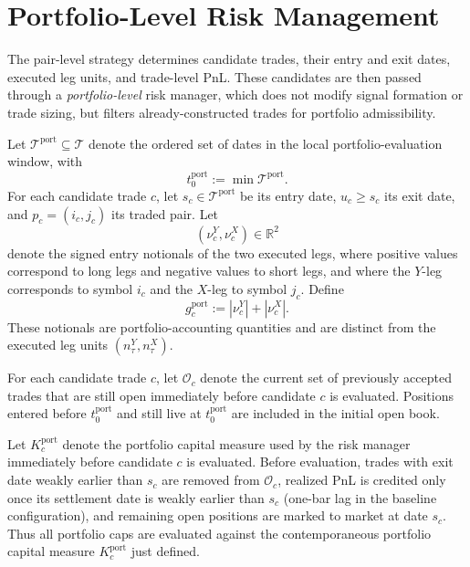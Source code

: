 \documentclass[11pt,a4paper]{article}
\begin{document}
\section{Portfolio-Level Risk Management}

The pair-level strategy determines candidate trades, their entry and exit dates,
executed leg units, and trade-level PnL. These candidates are then passed
through a \emph{portfolio-level} risk manager, which does not modify signal
formation or trade sizing, but filters already-constructed trades for portfolio
admissibility.

Let \(\mathcal T^{\mathrm{port}} \subseteq \mathcal T\) denote the ordered set
of dates in the local portfolio-evaluation window, with
\[
  t_0^{\mathrm{port}} := \min \mathcal T^{\mathrm{port}}.
\]
For each candidate trade \(c\), let \(s_c \in \mathcal T^{\mathrm{port}}\) be
its entry date, \(u_c \ge s_c\) its exit date, and \(p_c=(i_c,j_c)\) its traded
pair. Let
\[
  (\nu_c^Y,\nu_c^X)\in\mathbb R^2
\]
denote the signed entry notionals of the two executed legs, where positive
values correspond to long legs and negative values to short legs, and where the
\(Y\)-leg corresponds to symbol \(i_c\) and the \(X\)-leg to symbol \(j_c\).
Define
\[
  g_c^{\mathrm{port}} := |\nu_c^Y| + |\nu_c^X|.
\]
These notionals are portfolio-accounting quantities and are distinct from the
executed leg units \((n_\tau^Y,n_\tau^X)\).

For each candidate trade \(c\), let \(\mathcal O_c\) denote the current set of
previously accepted trades that are still open immediately before candidate
\(c\) is evaluated. Positions entered before \(t_0^{\mathrm{port}}\) and still
live at \(t_0^{\mathrm{port}}\) are included in the initial open book.

Let \(K_c^{\mathrm{port}}\) denote the portfolio capital measure used by the
risk manager immediately before candidate \(c\) is evaluated. Before
evaluation, trades with exit date weakly earlier than \(s_c\) are removed from
\(\mathcal O_c\), realized PnL is credited only once its settlement date is
weakly earlier than \(s_c\) (one-bar lag in the baseline configuration), and
remaining open positions are marked to market at date \(s_c\). Thus all
portfolio caps are evaluated against the contemporaneous portfolio capital
measure \(K_c^{\mathrm{port}}\) just defined.
\end{document}
